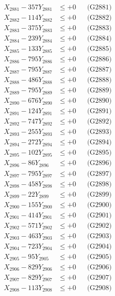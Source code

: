 \documentclass[a4paper,10pt]{article}
\begin{document}
{\begin{align}
\allowbreak
X_{2881} - 357Y_{2881} &\leq +0 && \text{(G2881)} \\
X_{2882} - 114Y_{2882} &\leq +0 && \text{(G2882)} \\
X_{2883} - 375Y_{2883} &\leq +0 && \text{(G2883)} \\
X_{2884} - 239Y_{2884} &\leq +0 && \text{(G2884)} \\
X_{2885} - 133Y_{2885} &\leq +0 && \text{(G2885)} \\
X_{2886} - 795Y_{2886} &\leq +0 && \text{(G2886)} \\
X_{2887} - 795Y_{2887} &\leq +0 && \text{(G2887)} \\
X_{2888} - 486Y_{2888} &\leq +0 && \text{(G2888)} \\
X_{2889} - 795Y_{2889} &\leq +0 && \text{(G2889)} \\
X_{2890} - 676Y_{2890} &\leq +0 && \text{(G2890)} \\
\allowbreak
X_{2891} - 124Y_{2891} &\leq +0 && \text{(G2891)} \\
X_{2892} - 747Y_{2892} &\leq +0 && \text{(G2892)} \\
X_{2893} - 255Y_{2893} &\leq +0 && \text{(G2893)} \\
X_{2894} - 272Y_{2894} &\leq +0 && \text{(G2894)} \\
X_{2895} - 102Y_{2895} &\leq +0 && \text{(G2895)} \\
X_{2896} - 86Y_{2896} &\leq +0 && \text{(G2896)} \\
X_{2897} - 795Y_{2897} &\leq +0 && \text{(G2897)} \\
X_{2898} - 458Y_{2898} &\leq +0 && \text{(G2898)} \\
X_{2899} - 22Y_{2899} &\leq +0 && \text{(G2899)} \\
X_{2900} - 155Y_{2900} &\leq +0 && \text{(G2900)} \\
\allowbreak
X_{2901} - 414Y_{2901} &\leq +0 && \text{(G2901)} \\
X_{2902} - 571Y_{2902} &\leq +0 && \text{(G2902)} \\
X_{2903} - 463Y_{2903} &\leq +0 && \text{(G2903)} \\
X_{2904} - 723Y_{2904} &\leq +0 && \text{(G2904)} \\
X_{2905} - 95Y_{2905} &\leq +0 && \text{(G2905)} \\
X_{2906} - 829Y_{2906} &\leq +0 && \text{(G2906)} \\
X_{2907} - 829Y_{2907} &\leq +0 && \text{(G2907)} \\
X_{2908} - 113Y_{2908} &\leq +0 && \text{(G2908)} \\

\end{align}}
\end{document}
